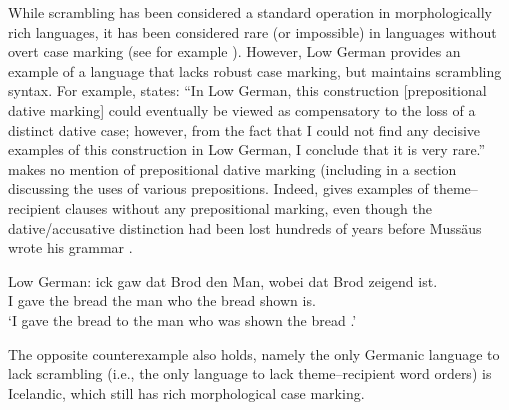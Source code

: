 While scrambling has been considered a standard operation in morphologically rich languages, it has been considered rare (or impossible) in languages without overt case marking (see for example \citet{Weerman.1997}). However, Low German provides an example of a language that lacks robust case marking, but maintains scrambling syntax. For example, \cite{Fleischer.2006} states: ``In Low German, this construction [prepositional dative marking] could eventually be viewed as compensatory to the loss of a distinct dative case; however, from the fact that I could not find any decisive examples of this construction in Low German, I conclude that it is very rare.'' \cite{Lindow.1998} makes no mention of prepositional dative marking (including in a section discussing the uses of various prepositions. Indeed, \cite{Mussaus.1829} gives examples of theme--recipient clauses without any prepositional marking, even though the dative/accusative distinction had been lost hundreds of years before Mussäus wrote his grammar \citep{Lasch.1914,Boden.1993}.

\begin{exe}
	\ex Low German:
	\gll ick gaw dat Brod den Man, wobei dat Brod zeigend ist.\\
	I gave the bread the man who the bread shown is.\\
	\trans `I gave the bread to the man who was shown the bread \citep{Mussaus.1829}.'
\end{exe}

The opposite counterexample also holds, namely the only Germanic language to lack scrambling (i.e., the only language to lack theme--recipient word orders) is Icelandic, which still has rich morphological case marking.



